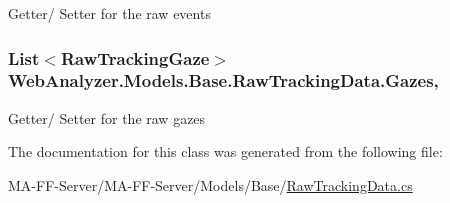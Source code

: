 Getter/ Setter for the raw events 

\hypertarget{class_web_analyzer_1_1_models_1_1_base_1_1_raw_tracking_data_a709969dfa88f800747d1bbabbdfb334e}{}
\subsubsection[{Gazes}]{\setlength{\rightskip}{0pt plus 5cm}List$<${\bf Raw\+Tracking\+Gaze}$>$ Web\+Analyzer.\+Models.\+Base.\+Raw\+Tracking\+Data.\+Gazes\hspace{0.3cm}{\ttfamily [get]}, {\ttfamily [set]}}\label{class_web_analyzer_1_1_models_1_1_base_1_1_raw_tracking_data_a709969dfa88f800747d1bbabbdfb334e}


Getter/ Setter for the raw gazes 



The documentation for this class was generated from the following file\+:\begin{DoxyCompactItemize}
\item 
M\+A-\/\+F\+F-\/\+Server/\+M\+A-\/\+F\+F-\/\+Server/\+Models/\+Base/\hyperlink{_raw_tracking_data_8cs}{Raw\+Tracking\+Data.\+cs}\end{DoxyCompactItemize}
